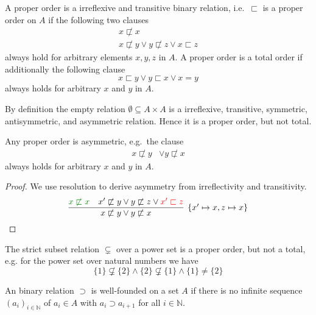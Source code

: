 \begin{definition}
	A {\myem proper order} is a irreflexive and transitive binary relation, 
	i.e.~$\sqsubset$ is a proper order on $A$ if the following two clauses
	\begin{align*}
	x\not\sqsubset x
	\tag*{irreflexivivity}
	\\
	x\not\sqsubset y \lor  y \not\sqsubset z \lor x\sqsubset z
	\tag*{transitivity}
	\end{align*}
	always hold for arbitrary elements $x,y,z$ in $A$.
	A proper order is a {\myem total order} if additionally the following clause
	\[
		x \sqsubset y \lor y \sqsubset x  \lor x=y \tag*{totality}
	\]
	always holds for arbitrary $x$ and $y$ in $A$.
\end{definition}

\begin{example}
	By definition the empty relation $\emptyset \subseteq A \times A$ is a
	irreflexive,
	transitive,
	symmetric,
	antisymmetric,
	and asymmetric
	relation. 
	Hence it is a proper order, but not total.
\end{example}

\begin{lemma}
	Any proper order is asymmetric, e.g.~the clause
	\begin{align*}
	x\not\sqsubset y &\lor y\not\sqsubset x \tag*{asymmetry}
	\end{align*}
	always holds for arbitrary $x$ and $y$ in $A$.
\end{lemma}

\begin{proof} We use resolution to derive asymmetry from irreflectivity and transitivity.
	\[
			\infer[\{x'\mapsto x, z\mapsto x \}]{
			x\not\sqsubset y \lor y\not\sqsubset x }{
			{\colHi x\not\sqsubset x} & x'\not\sqsubset y \lor  y \not\sqsubset z \lor {\colLo x'\sqsubset z}
		}
	\]
\end{proof}

\begin{example}The strict subset relation $\subsetneq$ over a power set is a proper order, but not a total, 
	e.g. for the power set over natural numbers we have 
	\[
	\{ 1 \} \not\subsetneq \{ 2 \}
	\land \{ 2 \} \not\subsetneq \{ 1 \}
	\land 	\{ 1 \} \neq \{ 2 \}
	\tag*{non-totality}
	\]
\end{example}



\begin{definition}
	An binary relation $\supset$ is {\myem well-founded} on a set $A$ if there is no infinite sequence 
	$(a_i)_{i\in\mathbb{N}}$ of $a_i\in A$
	with $a_i\supset a_{i+1}$ for all $i\in\mathbb{N}$.
\end{definition}

